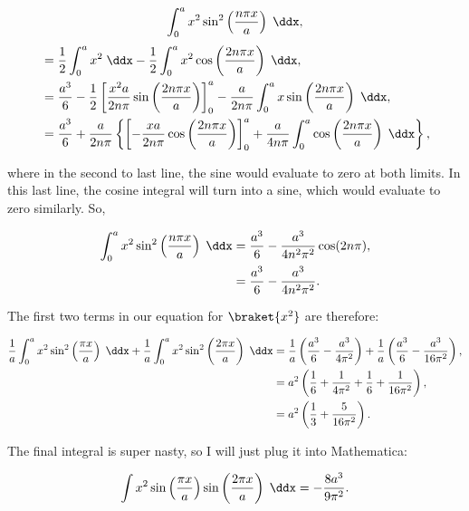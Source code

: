 \begin{equation*}
    \int_0^a x^2\sin^2 \left( \frac{n \pi x}{a} \right)\;\ddx,
\end{equation*}
\begin{align*}
    &= \frac{1}{2}\int_0^a x^2 \;\ddx - \frac{1}{2}\int_0^a x^2\cos\left( \frac{2n\pi x}{a} \right) \;\ddx, \\
    &= \frac{a^3}{6} - \frac{1}{2}\left[\frac{x^2a}{2n\pi}\sin\left( \frac{2n\pi x}{a} \right)\right]_0^a - \frac{a}{2n\pi} \int_0^a x\sin\left( \frac{2n\pi x}{a} \right) \;\ddx, \\
    &= \frac{a^3}{6} + \frac{a}{2n\pi} \left\{\left[ -\frac{xa}{2n\pi}\cos\left( \frac{2n\pi x}{a} \right) \right]_0^a + \frac{a}{4n\pi}\int_0^a\cos\left( \frac{2n\pi x}{a} \right)\;\ddx\right\},
\end{align*}

where in the second to last line, the sine would evaluate to zero at both limits. In this last line, the cosine integral will turn into a sine, which would evaluate to zero similarly. So,

\begin{align*}
    \int_0^a x^2\sin^2 \left( \frac{n \pi x}{a} \right)\;\ddx &= \frac{a^3}{6} - \frac{a^3}{4n^2\pi^2}\cos(2n\pi), \\
    &= \frac{a^3}{6} - \frac{a^3}{4n^2\pi^2}.
\end{align*}

The first two terms in our equation for $\braket{x^2}$ are therefore:

\begin{align*}
    \frac{1}{a}\int_0^a x^2\sin^2 \left( \frac{\pi x}{a} \right)\;\ddx + \frac{1}{a} \int_0^a x^2\sin^2 \left( \frac{2\pi x}{a} \right)\;\ddx &= \frac{1}{a} \left( \frac{a^3}{6} - \frac{a^3}{4\pi^2} \right) + \frac{1}{a} \left( \frac{a^3}{6} - \frac{a^3}{16\pi^2} \right), \\
    &= a^2 \left(\frac{1}{6} + \frac{1}{4\pi^2} + \frac{1}{6} + \frac{1}{16\pi^2}\right), \\
    &= a^2 \left( \frac{1}{3} + \frac{5}{16\pi^2} \right).
\end{align*}

The final integral is super nasty, so I will just plug it into Mathematica:

\begin{equation*}
    \int x^2 \sin\left( \frac{\pi x}{a} \right)\sin\left( \frac{2\pi x}{a} \right)\;\ddx = -\frac{8a^3}{9\pi^2}.
\end{equation*}

